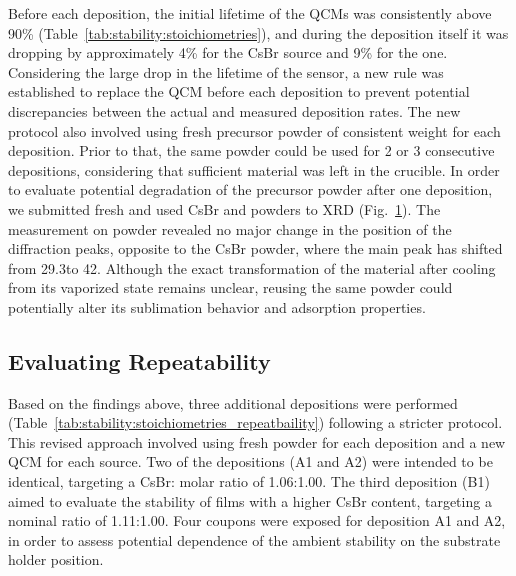 \begin{figure}[htbp]
    \caption{}   
    \label{fig:stability:fresh_used_powders}
\end{figure}

Before each deposition, the initial lifetime of the QCMs was consistently above 90\% (Table~\ref{tab:stability:stoichiometries}), and during the deposition itself it was dropping by approximately 4\% for the CsBr source and 9\% for the  one. Considering the large drop in the lifetime of the  sensor, a new rule was established to replace the QCM before each deposition to prevent potential discrepancies between the actual and measured deposition rates. The new protocol also involved using fresh precursor powder of consistent weight for each deposition. Prior to that, the same powder could be used for 2 or 3 consecutive depositions, considering that sufficient material was left in the crucible. In order to evaluate potential degradation of the precursor powder after one deposition, we submitted fresh and used CsBr and  powders to XRD (Fig.~\ref{fig:stability:fresh_used_powders}). The measurement on  powder revealed no major change in the position of the diffraction peaks, opposite to the CsBr powder, where the main peak has shifted from 29.3\degree to 42\degree. Although the exact transformation of the material after cooling from its vaporized state remains unclear, reusing the same powder could potentially alter its sublimation behavior and adsorption properties.


\subsection{Evaluating Repeatability}

Based on the findings above, three additional depositions were performed (Table~\ref{tab:stability:stoichiometries_repeatbaility}) following a stricter protocol. This revised approach involved using fresh powder for each deposition and a new QCM for each source. Two of the depositions (A1 and A2) were intended to be identical, targeting a CsBr: molar ratio of 1.06:1.00. The third deposition (B1) aimed to evaluate the stability of films with a higher CsBr content, targeting a nominal ratio of 1.11:1.00. Four coupons were exposed for deposition A1 and A2, in order to assess potential dependence of the ambient stability on the substrate holder position.


